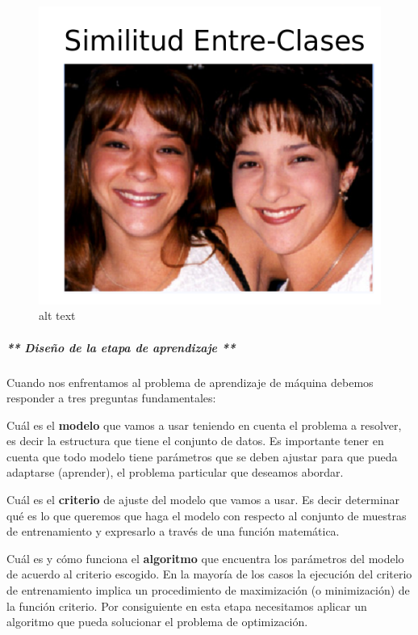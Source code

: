 \documentclass[11pt]{article}
\makeatletter
\def\maxwidth{\ifdim\Gin@nat@width>\linewidth\linewidth
    \else\Gin@nat@width\fi}
\let\Oldincludegraphics\includegraphics
\renewcommand{\includegraphics}[1]{\Oldincludegraphics[width=.8\maxwidth]{#1}}
\makeatother
\begin{document}
    \begin{figure}[htbp]
\centering
\includegraphics{./Images/ICSimilarity.png}
\caption{alt text}
\end{figure}

    \subparagraph{** Diseño de la etapa de aprendizaje
**}\label{diseuxf1o-de-la-etapa-de-aprendizaje}

    Cuando nos enfrentamos al problema de aprendizaje de máquina debemos
responder a tres preguntas fundamentales:

Cuál es el \textbf{modelo} que vamos a usar teniendo en cuenta el
problema a resolver, es decir la estructura que tiene el conjunto de
datos. Es importante tener en cuenta que todo modelo tiene parámetros
que se deben ajustar para que pueda adaptarse (aprender), el problema
particular que deseamos abordar.

Cuál es el \textbf{criterio} de ajuste del modelo que vamos a usar. Es
decir determinar qué es lo que queremos que haga el modelo con respecto
al conjunto de muestras de entrenamiento y expresarlo a través de una
función matemática.

Cuál es y cómo funciona el \textbf{algoritmo} que encuentra los
parámetros del modelo de acuerdo al criterio escogido. En la mayoría de
los casos la ejecución del criterio de entrenamiento implica un
procedimiento de maximización (o minimización) de la función criterio.
Por consiguiente en esta etapa necesitamos aplicar un algoritmo que
pueda solucionar el problema de optimización.
\end{document}
